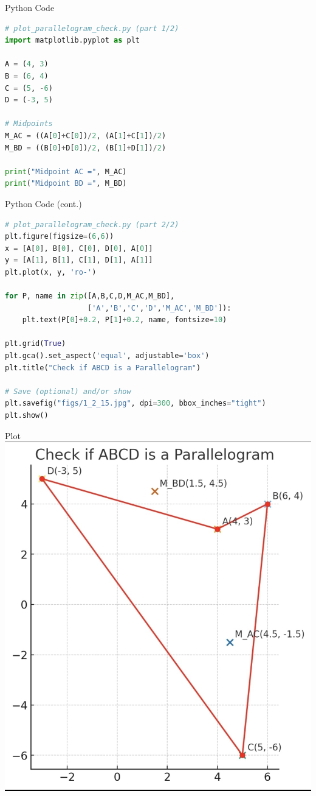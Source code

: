 \documentclass{beamer}
\begin{document}
\begin{frame}[fragile]{Python Code}
\begin{lstlisting}[language=Python]
# plot_parallelogram_check.py (part 1/2)
import matplotlib.pyplot as plt

A = (4, 3)
B = (6, 4)
C = (5, -6)
D = (-3, 5)

# Midpoints
M_AC = ((A[0]+C[0])/2, (A[1]+C[1])/2)
M_BD = ((B[0]+D[0])/2, (B[1]+D[1])/2)

print("Midpoint AC =", M_AC)
print("Midpoint BD =", M_BD)
\end{lstlisting}
\end{frame}

\begin{frame}[fragile]{Python Code (cont.)}
\begin{lstlisting}[language=Python]
# plot_parallelogram_check.py (part 2/2)
plt.figure(figsize=(6,6))
x = [A[0], B[0], C[0], D[0], A[0]]
y = [A[1], B[1], C[1], D[1], A[1]]
plt.plot(x, y, 'ro-')

for P, name in zip([A,B,C,D,M_AC,M_BD],
                   ['A','B','C','D','M_AC','M_BD']):
    plt.text(P[0]+0.2, P[1]+0.2, name, fontsize=10)

plt.grid(True)
plt.gca().set_aspect('equal', adjustable='box')
plt.title("Check if ABCD is a Parallelogram")

# Save (optional) and/or show
plt.savefig("figs/1_2_15.jpg", dpi=300, bbox_inches="tight")
plt.show()
\end{lstlisting}
\end{frame}

\begin{frame}{Plot}
\centering
\includegraphics[width=0.61\linewidth]{figs/1_2_15.jpg}
\end{frame}
\end{document}
